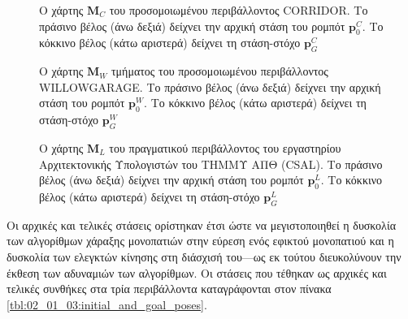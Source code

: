 \begin{figure}\centering
  
  \vspace{0.3cm}
  \caption{\small Ο χάρτης $\bm{M}_C$ του προσομοιωμένου περιβάλλοντος CORRIDOR.
           Το πράσινο βέλος (άνω δεξιά) δείχνει την αρχική στάση του ρομπότ
           $\bm{p}_0^C$. Tο κόκκινο βέλος (κάτω αριστερά) δείχνει τη στάση-στόχο
           $\bm{p}_G^C$}
  \label{fig:02_01_03:map_corridor}
\end{figure}

\begin{figure}\centering
  
  \vspace{0.1cm}
  \caption{\small Ο χάρτης $\bm{M}_W$ τμήματος του προσομοιωμένου περιβάλλοντος
           WILLOWGARAGE. Το πράσινο βέλος (άνω δεξιά) δείχνει την αρχική στάση
           του ρομπότ $\bm{p}_0^W$. Tο κόκκινο βέλος (κάτω αριστερά) δείχνει τη
           στάση-στόχο $\bm{p}_G^W$}
  \label{fig:02_01_03:map_willowgarage}
\end{figure}

\begin{figure}\centering
  
  \vspace{-0.2cm}
  \caption{\small Ο χάρτης $\bm{M}_L$ του πραγματικού περιβάλλοντος του
           εργαστηρίου Αρχιτεκτονικής Υπολογιστών του ΤΗΜΜΥ ΑΠΘ (CSAL). Το
           πράσινο βέλος (άνω δεξιά) δείχνει την αρχική στάση του ρομπότ
           $\bm{p}_0^L$. Tο κόκκινο βέλος (κάτω αριστερά) δείχνει τη στάση-στόχο
           $\bm{p}_G^L$}
  \label{fig:02_01_03:map_csal}
\end{figure}

Οι αρχικές και τελικές στάσεις ορίστηκαν έτσι ώστε να μεγιστοποιηθεί η δυσκολία
των αλγορίθμων χάραξης μονοπατιών στην εύρεση ενός εφικτού μονοπατιού και η
δυσκολία των ελεγκτών κίνησης στη διάσχισή του---ως εκ τούτου διευκολύνουν την
έκθεση των αδυναμιών των αλγορίθμων. Οι στάσεις που τέθηκαν ως αρχικές
και τελικές συνθήκες στα τρία περιβάλλοντα καταγράφονται στον πίνακα
\ref{tbl:02_01_03:initial_and_goal_poses}.

